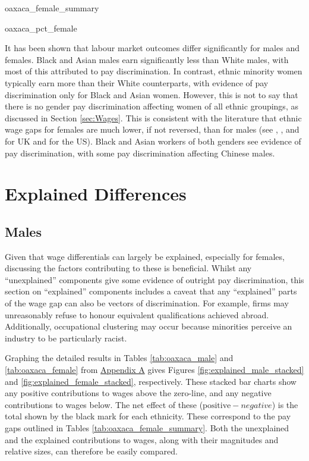 \documentclass[class=article, crop=false]{standalone}
\begin{document}
{oaxaca_female_summary}

{oaxaca_pct_female}

It has been shown that labour market outcomes differ significantly for males and females. Black and Asian males earn significantly less than White males, with most of this attributed to pay discrimination. In contrast, ethnic minority women typically earn more than their White counterparts, with evidence of pay discrimination only for Black and Asian women. However, this is not to say that there is no gender pay discrimination affecting women of all ethnic groupings, as discussed in Section \ref{sec:Wages}. This is consistent with the literature that ethnic wage gaps for females are much lower, if not reversed, than for males (see \citet{ONSe}, \citet{Metcalf}, and \citet{Longhi3} for UK and \citet{Bayard} for the US). Black and Asian workers of both genders see evidence of pay discrimination, with some pay discrimination affecting Chinese males. %

\section{Explained Differences}
\label{sec:explained_diff}
\subsection{Males}
\label{sec:male_explained}
Given that wage differentials can largely be explained, especially for females, discussing the factors contributing to these is beneficial. Whilst any \enquote{unexplained} components give some evidence of outright pay discrimination, this section on \enquote{explained} components includes a caveat that any \enquote{explained} parts of the wage gap can also be vectors of discrimination. For example, firms may unreasonably refuse to honour equivalent qualifications achieved abroad. Additionally, occupational clustering may occur because minorities perceive an industry to be particularly racist. 

Graphing the detailed results in Tables \ref{tab:oaxaca_male} and \ref{tab:oaxaca_female} from \hyperref[sec:appendixA]{Appendix A} gives Figures \ref{fig:explained_male_stacked} and \ref{fig:explained_female_stacked}, respectively. These stacked bar charts show any positive contributions to wages above the zero-line, and any negative contributions to wages below. The net effect of these ($\text{positive}-{negative}$) is the total shown by the black mark for each ethnicity. These correspond to the pay gaps outlined in Tables \ref{tab:oaxaca_female_summary}. Both the unexplained and the explained contributions to wages, along with their magnitudes and relative sizes, can therefore be easily compared.
\end{document}
